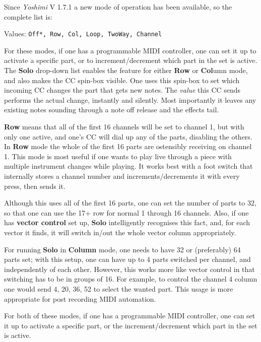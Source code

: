    Since \textsl{Yoshimi} V 1.7.1 a new mode of operation has been available, so the complete list is:

   Values: \texttt{Off*, Row, Col, Loop, TwoWay, Channel}

   For these modes, if one has a programmable MIDI controller, one can set it
   up to activate a specific part, or to increment/decrement which part in the
   set is active.  The \textbf{Solo} drop-down list enables the feature for
   either \textbf{Row} or \textbf{Col}umn mode, and also makes the CC spin-box
   visible.
   One uses this spin-box to set which incoming CC changes the part that gets
   new notes.
   The \textsl{value} this CC sends performs the actual change, instantly and
   silently. Most importantly it leaves any existing notes sounding through a
   note off release and the effects tail.

   \textbf{Row} means that all of the first 16 channels will be set to channel
   1, but with only one active, and one's CC will dial up any of the parts,
   disabling the others.
   In \textbf{Row} mode the whole of the first 16 parts are ostensibly
   receiving on channel 1.  This mode is most useful if one wants to play live
   through a piece with multiple instrument changes while playing. It works
   best with a foot switch that internally stores a channel number and
   increments/decrements it with every press, then sends it.

   Although this uses all of the first 16 parts, one can set the number of
   parts to 32, so that one can use the 17+ row for normal 1 through 16
   channels. Also, if one has \textbf{vector control} set up, \textbf{Solo}
   intelligently recognises this fact, and, for each vector it finds, it will
   switch in/out the whole vector column appropriately.

   For running \textbf{Solo} in \textbf{Column} mode, one needs to have 32 or
   (preferably) 64 parts set; with this setup, one can have up to 4 parts
   switched per channel, and independently of each other. However, this works
   more like vector control in that switching has to be in groups of 16. For
   example, to control the channel 4 column one would send 4, 20, 36, 52 to
   select the wanted part. This usage is more appropriate for post recording
   MIDI automation.

   For both of these modes, if one has a programmable MIDI controller, one can
   set it up to activate a specific part, or the increment/decrement which part
   in the set is active.

